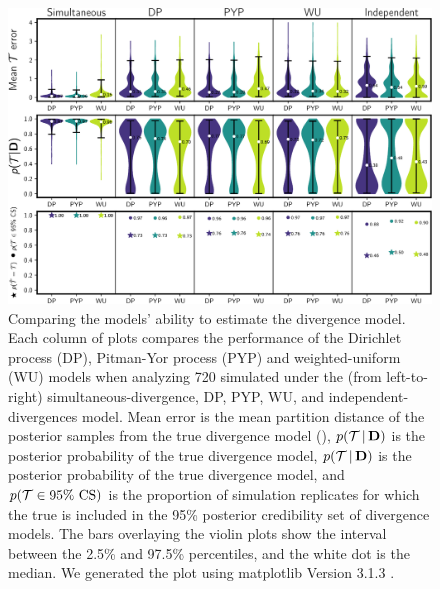 \documentclass[letterpaper,12pt]{article}
\begin{document}
\begin{figure}[htbp]
    \begin{center}
        \includegraphics[width=\textwidth,height=\textheight,keepaspectratio]{../images/from-project-repo/model-performance-violin-cropped.pdf}
        \captionsetup{listformat=figList}
        \caption{
        Comparing the models' ability to estimate the divergence model.
        Each column of plots compares the performance of the Dirichlet process
        (DP), Pitman-Yor process (PYP) and weighted-uniform (WU) models when
        analyzing 720 \datasets simulated under the (from left-to-right)
        simultaneous-divergence, DP, PYP, WU, and independent-divergences
        model. 
        Mean \etimesets error is the mean partition distance
        of the posterior samples from the true
        divergence model (\etimesets),
        $p(\mathcal{T} \,|\, \mathbf{D})$ is the posterior probability
        of the true divergence model,
        $p(\mathcal{T} \,|\, \mathbf{D})$ is the posterior probability of the
        true divergence model,
        and
        $p(\mathcal{T} \in \textrm{95\% CS})$ is the proportion of simulation
        replicates for which the true \etimesets is included in the 95\%
        posterior credibility set of divergence models.
        The bars overlaying the violin plots show the interval between the
        2.5\% and 97.5\% percentiles, and the white dot is the median.
        We generated the plot using matplotlib Version 3.1.3
        \citep{matplotlib}.
        }
        \label{fig:modelperformancegrid}
    \end{center}
\end{figure}
\end{document}
